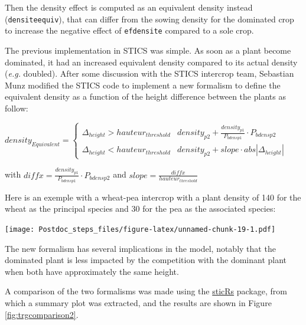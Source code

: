 \documentclass[]{book}
\theoremstyle{definition}
\theoremstyle{definition}
\theoremstyle{definition}
\theoremstyle{remark}
\begin{document}
Then the density effect is computed as an equivalent density instead
(\texttt{densiteequiv}), that can differ from the sowing density for the
dominated crop to increase the negative effect of \texttt{efdensite}
compared to a sole crop.

The previous implementation in STICS was simple. As soon as a plant
become dominated, it had an increased equivalent density compared to its
actual density (\emph{e.g.} doubled). After some discussion with the
STICS intercrop team, Sebastian Munz modified the STICS code to
implement a new formalism to define the equivalent density as a function
of the height difference between the plants as follow:

\(density_{Equivalent} =\begin{cases}\Delta_{height} > hauteur_{threshold} & density_{p2} + \frac{density_{p1}}{P_{bdensp1}}\cdot P_{bdensp2} \\ \Delta_{height} < hauteur_{threshold} & density_{p2}+slope\cdot abs\left|\Delta_{height}\right| \end{cases}\)

with \(diffx= \frac{density_{p1}}{P_{bdensp1}}\cdot P_{bdensp2}\) and
\(slope= \frac{diffx}{hauteur_{threshold}}\)

Here is an exemple with a wheat-pea intercrop with a plant density of
140 for the wheat as the principal species and 30 for the pea as the
associated species:

\texttt{[image: Postdoc\_steps\_files/figure-latex/unnamed-chunk-19-1.pdf]}

The new formalism has several implications in the model, notably that
the dominated plant is less impacted by the competition with the
dominant plant when both have approximately the same height.

A comparison of the two formalisms was made using the
\href{https://github.com/VEZY/sticRs}{sticRs} package, from which a
summary plot was extracted, and the results are shown in Figure
\ref{fig:trgcomparison2}.
\end{document}
